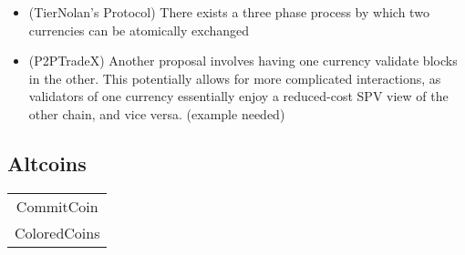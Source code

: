 \begin{itemize}
\item (TierNolan's Protocol) There exists a three phase process by which two currencies can be atomically exchanged
\item (P2PTradeX) Another proposal involves having one currency validate blocks in the other. This potentially allows for more complicated interactions, as validators of one currency essentially enjoy a reduced-cost SPV view of the other chain, and vice versa. (example needed)
\end{itemize}

\subsection{Altcoins}


\begin{table}
\begin{tabular}{c}
CommitCoin \\
ColoredCoins \\
\end{tabular}
\end{table}
